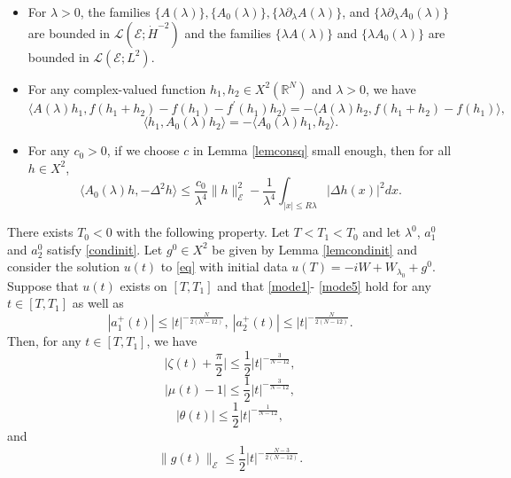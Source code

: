 \documentclass[10pt,a4paper]{amsart}
\newcommand{\R}{\mathbb{R}}
\begin{document}
\begin{lem}
\label{lemproperA}
\begin{itemize}
\item[(i)] For $\lambda>0$, the families $\{A(\lambda )\}, \{A_0 (\lambda) \}, \{\lambda \partial_\lambda A(\lambda)\}$, and $\{\lambda \partial_\lambda A_0 (\lambda)\}$ are bounded in $\mathcal{L} (\mathcal{E} ; \dot{H}^{-2})$ and the families $\{\lambda A(\lambda)\}$ and  $\{\lambda A_0 (\lambda)\}$ are bounded in $\mathcal{L} (\mathcal{E} ; L^2)$.
\item[(ii)] For any complex-valued function $h_1 ,h_2 \in X^2 (\R^N)$ and $\lambda>0$, we have
\begin{equation}
\label{properA1}
\langle A(\lambda)h_1 , f(h_1 +h_2) - f(h_1) - f^\prime (h_1) h_2\rangle = - \langle A(\lambda)h_2 , f(h_1 +h_2) - f(h_1) \rangle ,
\end{equation}
\begin{equation}
\label{properA2}
\langle h_1 ,A_0 (\lambda) h_2 \rangle =- \langle A_0 (\lambda ) h_1 ,h_2 \rangle .
\end{equation}
\item[(iii)] For any $c_0>0$, if we choose $c$ in Lemma \ref{lemconsq} small enough, then for all $h\in X^2$,
\begin{equation}
\label{properA3}
\langle A_0 (\lambda )h, -\Delta^2 h \rangle \leq \dfrac{c_0}{\lambda^4 } \|h\|^2_{\mathcal{E}} - \dfrac{1}{\lambda^4} \int_{|x|\leq R \lambda} |\Delta h(x)|^2 dx .
\end{equation}
\end{itemize}
\end{lem}

\begin{prop}\label{4-4}
There exists $T_0<0$ with the following property. Let $T<T_1<T_0$ and let $\lambda^0$, $a_1^0$ and $a_2^0$ satisfy \eqref{condinit}. Let $g^0 \in X^2$ be given by Lemma \ref{lemcondinit} and consider the solution $u(t)$ to \eqref{eq} with initial data $u(T)=-iW+W_{\lambda_0}+g^0$. Suppose that $u(t)$ exists on $[T,T_1]$ and that \eqref{mode1}- \eqref{mode5} hold for any $t\in [T,T_1]$ as well as
\begin{equation}
\label{lastcondai}
|a_1^+ (t)| \leq |t|^{-\frac{N}{2(N-12)}},\ |a_2^+ (t)|\leq |t|^{-\frac{N}{2(N-12)}} .
\end{equation}
Then, for any $t\in [T,T_1]$, we have
\begin{equation}
\label{lastconde1}
\big|\zeta (t) +\frac{\pi}{2}\big| \leq \frac{1}{2} |t|^{-\frac{3}{N-12}},
\end{equation}
\begin{equation}
\label{lastconde2}
|\mu (t) -1|\leq \frac{1}{2} |t|^{-\frac{3}{N-12}},
\end{equation}
\begin{equation}
\label{lastconde3}
|\theta (t)|\leq \frac{1}{2} |t|^{-\frac{1}{N-12}},
\end{equation}
and
\begin{equation}
\label{lastconde4}
\|g(t)\|_{\mathcal{E}} \leq \frac{1}{2}|t|^{- \frac{N-3}{2(N-12)}}.
\end{equation}

\end{prop} 
\end{document}
